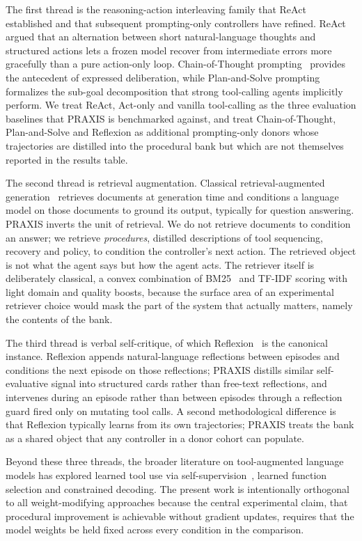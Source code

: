 \documentclass[conference]{IEEEtran}
\begin{document}
The first thread is the reasoning-action interleaving family that
ReAct~\cite{react} established and that subsequent prompting-only
controllers have refined. ReAct argued that an alternation between
short natural-language thoughts and structured actions lets a
frozen model recover from intermediate errors more gracefully than
a pure action-only loop. Chain-of-Thought prompting~\cite{cot}
provides the antecedent of expressed deliberation, while
Plan-and-Solve prompting~\cite{plansolve} formalizes the
sub-goal decomposition that strong tool-calling agents implicitly
perform. We treat ReAct, Act-only and vanilla tool-calling as the
three evaluation baselines that PRAXIS is benchmarked against, and
treat Chain-of-Thought, Plan-and-Solve and Reflexion as additional
prompting-only donors whose trajectories are distilled into the
procedural bank but which are not themselves reported in the
results table.

The second thread is retrieval augmentation. Classical
retrieval-augmented generation~\cite{rag} retrieves documents at
generation time and conditions a language model on those documents
to ground its output, typically for question answering. PRAXIS
inverts the unit of retrieval. We do not retrieve documents to
condition an answer; we retrieve \emph{procedures}, distilled
descriptions of tool sequencing, recovery and policy, to condition
the controller's next action. The retrieved object is not what the
agent says but how the agent acts. The retriever itself is
deliberately classical, a convex combination of BM25~\cite{bm25}
and TF-IDF scoring with light domain and quality boosts, because
the surface area of an experimental retriever choice would mask
the part of the system that actually matters, namely the contents
of the bank.

The third thread is verbal self-critique, of which Reflexion~\cite{reflexion}
is the canonical instance. Reflexion appends natural-language
reflections between episodes and conditions the next episode on
those reflections; PRAXIS distills similar self-evaluative signal
into structured cards rather than free-text reflections, and
intervenes during an episode rather than between episodes through
a reflection guard fired only on mutating tool calls. A second
methodological difference is that Reflexion typically learns from
its own trajectories; PRAXIS treats the bank as a shared object
that any controller in a donor cohort can populate.

Beyond these three threads, the broader literature on
tool-augmented language models has explored learned tool use via
self-supervision~\cite{toolformer}, learned function selection and
constrained decoding. The present work is intentionally orthogonal
to all weight-modifying approaches because the central
experimental claim, that procedural improvement is achievable
without gradient updates, requires that the model weights be held
fixed across every condition in the comparison.
\end{document}
